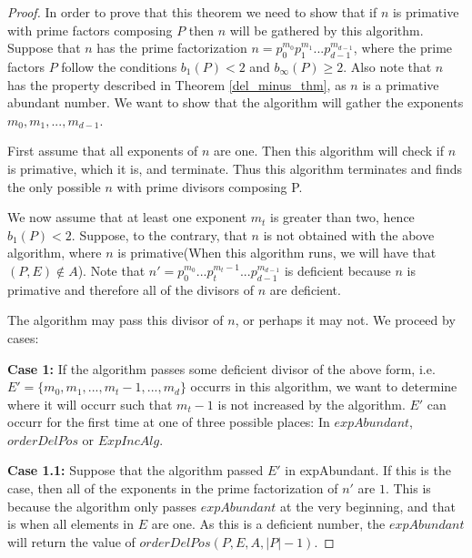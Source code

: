 \documentclass[../paper.tex]{subfiles}
\begin{document}
\begin{proof}
  In order to prove that this theorem we need to show that if $n$
is primative with prime factors composing $P$ then $n$ 
will be gathered by this algorithm. Suppose that $n$ has the
prime factorization $n = p_0^{m_0} p_1^{m_1} ...
p_{d-1}^{m_{d-1}}$, where the prime factors $P$ follow the
conditions $b_1(P) < 2$ and $b_{\infty}(P) \geq 2$. Also note 
that $n$ has the property described in Theorem
{\ref{del_minus_thm}}, as $n$ is a primative abundant number. 
We want to show that the algorithm will gather the exponents 
$m_0, m_1, ..., m_{d-1}$. 

  First assume that all exponents of $n$ are one. Then this
algorithm will check if $n$ is primative, which it is, and
terminate. Thus this algorithm terminates and finds the only
possible $n$ with prime divisors composing P. 


  We now assume that at least one exponent $m_t$ is greater than
two, hence $b_1(P) < 2$. Suppose, to the contrary, that $n$ is not
obtained with the above algorithm, where $n$ is primative(When
this algorithm runs, we will have that $(P,E) \notin A$). Note that 
$n' = p_0^{m_0}...p_t^{m_t - 1}...p_{d-1}^{m_{d-1}}$ is deficient 
because $n$ is primative and therefore all of the divisors of $n$
are deficient. 

  The algorithm may pass this divisor of $n$, or perhaps it may
not. We proceed by cases:

\textbf{Case 1:}
  If the algorithm passes some deficient divisor of the above form, 
i.e. $E' = \{m_0, m_1, ..., m_t - 1, ..., m_d \}$ occurrs in this 
algorithm, we want to determine where it will occurr such that 
$m_t - 1$ is not increased by the algorithm. $E'$ can occurr for
the first time at one of three possible places: In $expAbundant$, 
$orderDelPos$ or $ExpIncAlg$.

\textbf{Case 1.1:}  
  Suppose that the algorithm passed $E'$ in expAbundant. If this
is the case, then all of the exponents in the prime factorization
of $n'$ are $1$. This is because the algorithm only passes
$expAbundant$ at the very beginning, and that is when all elements
in $E$ are one. As this is a deficient number, the $expAbundant$
will return the value of $orderDelPos(P,E,A,|P| - 1)$.



\end{proof}
\end{document}
